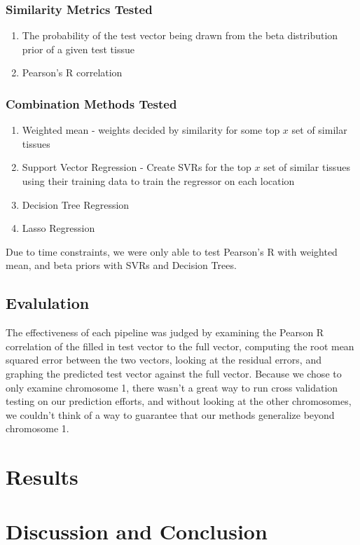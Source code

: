 \documentclass{article} %
\begin{document}
\subsubsection{Similarity Metrics Tested}
\begin{enumerate}
	\item The probability of the test vector being drawn from the beta distribution prior of a given test tissue
	\item Pearson's R correlation
\end{enumerate}

\subsubsection{Combination Methods Tested}
\begin{enumerate}
	\item Weighted mean - weights decided by similarity for some top $x$ set of similar tissues
	\item Support Vector Regression - Create SVRs for the top $x$ set of similar tissues using their training data to train the regressor on each location
	\item Decision Tree Regression
	\item Lasso Regression
\end{enumerate}

Due to time constraints, we were only able to test Pearson's R with weighted mean, and beta priors with SVRs and Decision Trees.

\subsection{Evalulation}
The effectiveness of each pipeline was judged by examining the Pearson R correlation of the filled in test vector to the full vector, computing the root mean squared error between the two vectors, looking at the residual errors, and graphing the predicted test vector against the full vector. Because we chose to only examine chromosome 1, there wasn't a great way to run cross validation testing on our prediction efforts, and without looking at the other chromosomes, we couldn't think of a way to guarantee that our methods generalize beyond chromosome 1.

\section{Results}


\section{Discussion and Conclusion}
\end{document}

